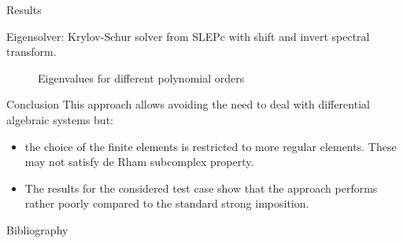 \documentclass[aspectratio=169]{beamer}
\begin{document}
\begin{frame}{Results}
	
	Eigensolver: Krylov-Schur solver from SLEPc with shift and invert spectral transform.
	
	\begin{figure}
		\centering
		\caption*{Eigenvalues for different polynomial orders}%
	\end{figure}
	

\end{frame}

\begin{frame}{Conclusion}
	This approach allows avoiding the need to deal with differential algebraic systems but:
	\begin{itemize}
		\item the choice of the finite elements is restricted to more regular elements. These may not satisfy de Rham subcomplex property.
		\item The results for the considered
		test case show that the approach performs rather poorly
		compared to the standard strong imposition.
	\end{itemize}
\end{frame}

\begin{frame}{Bibliography}
	\printbibliography
\end{frame}

	\appendix
	
	
	
	
\end{document}
